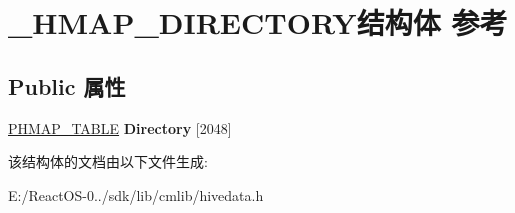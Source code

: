 \hypertarget{struct___h_m_a_p___d_i_r_e_c_t_o_r_y}{}\section{\+\_\+\+H\+M\+A\+P\+\_\+\+D\+I\+R\+E\+C\+T\+O\+R\+Y结构体 参考}
\label{struct___h_m_a_p___d_i_r_e_c_t_o_r_y}
\subsection*{Public 属性}
\begin{DoxyCompactItemize}
\item 
\mbox{\label{struct___h_m_a_p___d_i_r_e_c_t_o_r_y_abc0940ebeaccd1e52523ee6f0588d776}} 
\hyperlink{struct___h_m_a_p___t_a_b_l_e}{P\+H\+M\+A\+P\+\_\+\+T\+A\+B\+LE} {\bfseries Directory} \mbox{[}2048\mbox{]}
\end{DoxyCompactItemize}


该结构体的文档由以下文件生成\+:\begin{DoxyCompactItemize}
\item 
E\+:/\+React\+O\+S-\/0../sdk/lib/cmlib/hivedata.\+h\end{DoxyCompactItemize}
